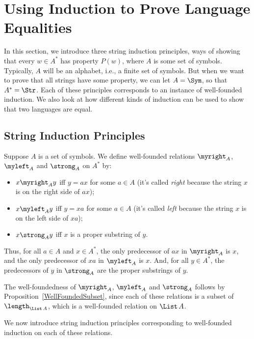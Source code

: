 \section{Using Induction to Prove Language Equalities}
\label{UsingInductionToProveLanguageEqualities}

In this section, we introduce three string induction principles, ways
of showing that every $w\in A^*$ has property $P(w)$, where $A$ is
some set of symbols.
Typically, $A$ will be an alphabet, i.e., a finite set of symbols.
But when we want to prove that all strings have some
property, we can let $A=\Sym$, so that $A^*=\Str$.
Each of these principles corresponds to an
instance of well-founded induction.  We also look at how different
kinds of induction can be used to show that two languages are equal.

\subsection{String Induction Principles}

Suppose $A$ is a set of symbols.  We define well-founded relations
$\myright_A$, $\myleft_A$ and $\strong_A$ on $A^*$ by:
\begin{itemize}
\item $x\myright_A y$ iff $y=ax$ for some $a\in A$
(it's called \emph{right} because the string $x$ is on the right
side of $ax$);
\item $x\myleft_A y$ iff $y=xa$ for some $a\in A$
(it's called \emph{left} because the string $x$ is on the left
side of $xa$);
\item $x\strong_A y$ iff $x$ is a proper substring of $y$.
\end{itemize}
Thus, for all $a\in A$ and $x\in A^*$, the only predecessor of $ax$ in
$\myright_A$ is $x$, and the only predecessor of $xa$ in
$\myleft_A$ is $x$.  And, for all $y\in A^*$, the predecessors
of $y$ in $\strong_A$ are the proper substrings of $y$.

The well-foundedness of $\myright_A$, $\myleft_A$ and $\strong_A$
follows by Proposition~\ref{WellFoundedSubset}, since each of these
relations is a subset of $\length_{\List\,A}$, which is a well-founded
relation on $\List\,A$.

We now introduce string induction principles corresponding to
well-founded induction on each of these relations.

